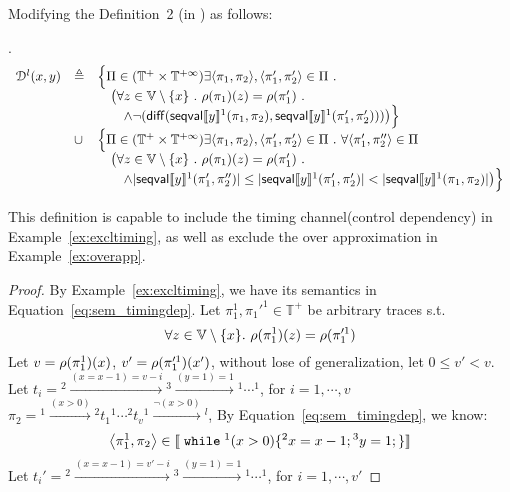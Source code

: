 \begin{example}
Modifying the Definition~2 (in \cite{cousot2019abstract}) as follows:
\begin{defn}.
\label{defn:mdfy_dep}
\[
	\begin{array}{lll}
	\mathcal{D}^l(x, y) & \triangleq &
	\Big\{ 
	\Pi \in (\mathbb{T}^{+} \times \mathbb{T}^{+\infty})
	\exists \langle \pi_1, \pi_2 \rangle, \langle \pi_1', \pi_2' \rangle \in \Pi ~.~ \\
	&& \quad \big(
	\forall z \in \mathbb{V}\setminus \{x\} ~.~ \rho(\pi_1)(z) = \rho(\pi_1') ~.~ \\
	&& \quad  \quad \land \neg(\mathsf{diff}(\mathsf{seqval}\llbracket y \rrbracket{}^1(\pi_1, \pi_2 ), \mathsf{seqval}\llbracket y \rrbracket{}^1(\pi'_1, \pi_2')))
	\big) \Big\} \\
	& \cup & \Big\{ \Pi \in (\mathbb{T}^{+} \times \mathbb{T}^{+\infty})
	\exists \langle \pi_1, \pi_2 \rangle, \langle \pi_1', \pi_2' \rangle \in \Pi ~.~ \forall \langle \pi_1', \pi_2'' \rangle \in \Pi\\
	&& \quad \big(
	\forall z \in \mathbb{V}\setminus \{x\} ~.~ \rho(\pi_1)(z) = \rho(\pi_1') ~.~ \\
	&& \quad  \quad  \land |\mathsf{seqval}\llbracket y \rrbracket{}^1(\pi_1', \pi_2'')| \leq |\mathsf{seqval}\llbracket y \rrbracket{}^1(\pi_1', \pi_2')| <  
	|\mathsf{seqval}\llbracket y \rrbracket{}^1(\pi_1, \pi_2)|\big) \Big\}
	\end{array}
\]
\end{defn}
This definition is capable to include the timing channel(control dependency) in Example~\ref{ex:excltiming},
as well as exclude the over approximation in Example~\ref{ex:overapp}.
%
\begin{proof}
By Example~\ref{ex:excltiming}, we have its semantics in Equation~\ref{eq:sem_timingdep}.
%
%
Let $\pi_1^1, \pi_1'^1 \in \mathbb{T^{+}}$ be arbitrary traces s.t. 
%
$$\forall z \in \mathbb{V}\setminus \{x\}. ~ \rho(\pi_1^1)(z) = \rho(\pi_1'^1) $$ 
%
Let $v = \rho(\pi_1^1)(x) $, $v' = \rho(\pi_1'^1)(x')$, without lose of generalization, let $0 \leq v' < v$.
\\
Let 
$t_i = {}^2 \xrightarrow{(x = x - 1) = v - i } {}^3 \xrightarrow{(y = 1) = 1} {}^1 \cdots  {}^1$, for $i = 1, \cdots, v$
%
$\pi_2 = {}^1 \xrightarrow{(x > 0)} {}^2 t_1 {}^1 \cdots   {}^2 t_v {}^1 \xrightarrow{\neg(x > 0)} {}^l $,
%
 By Equation~\ref{eq:sem_timingdep}, we know:
\[
	\left< \pi_1^1, \pi_2 \right> \in \sem{\ewhile {}^1 (x > 0) \{{}^2 x = x - 1; {}^3 y = 1;\} }
\]
%
Let 
$t_i' = {}^2 \xrightarrow{(x = x - 1) = v' - i } {}^3 \xrightarrow{(y = 1) = 1} {}^1 \cdots  {}^1$, for $i = 1, \cdots, v'$

\end{proof}
\end{example}
